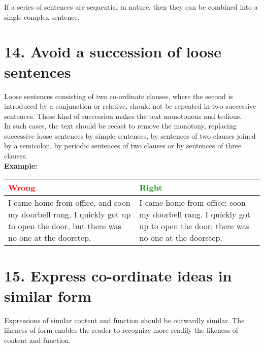 \documentclass{report}
\begin{document}
If a series of sentences are sequential in nature, then they can be combined into a single complex sentence.

\endgraf\bigskip

\section*{14. Avoid a succession of loose sentences}

Loose sentences consisting of two co-ordinate clauses, where the second is introduced by a conjunction or relative, should not be repeated in two successive sentences. These kind of succession makes the text monotonous and tedious.\\

In such cases, the text should be recast to remove the monotony, replacing successive loose sentences by simple sentences, by sentences of two clauses joined by a semicolon, by periodic sentences of two clauses or by sentences of three clauses.\\

\textbf{Example:}
\begin{center}
\begin{tabular}{|C{5.5cm}|C{5.5cm}|}
 \hline
 \textcolor{red}{Wrong} & \textcolor{green}{Right}\\\hline
 I came home from office, and soon my doorbell rang. I quickly got up to open the door, but there was no one at the doorstep.
 & I came home from office; soon my doorbell rang. I quickly got up to open the door; there was no one at the doorstep.\\\hline
\end{tabular}
\end{center}

\newpage

\section*{15. Express co-ordinate ideas in similar form}

Expressions of similar content and function should be outwardly similar. The likeness of form enables the reader to recognize more readily the likeness of content and function.

\endgraf\bigskip
\end{document}

